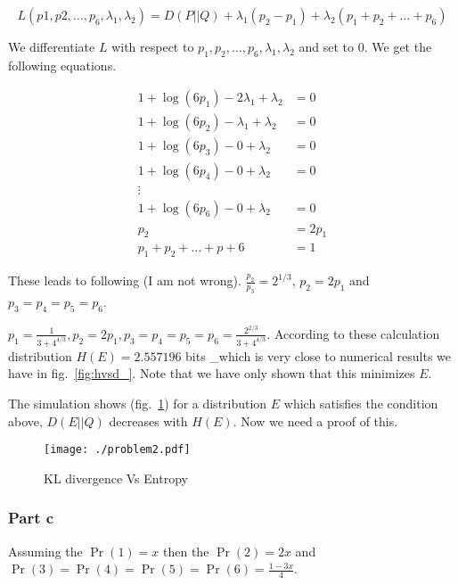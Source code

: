 \documentclass[]{article}
\begin{document}
\[L(p1,p2,\ldots,p_6,\lambda_1,\lambda_2) = D(P||Q) + \lambda_1(p_2-p_1) + 
\lambda_2(p_1+p_2+\ldots+p_6)\]

We differentiate \(L\) with respect to
\(p_1,p_2,\ldots,p_6,\lambda_1,\lambda_2\) and set to 0. We get the
following equations.

\[
\begin{aligned}
1 + \log( 6p_1 ) - 2 \lambda_1 + \lambda_2 &= 0 \\
1 + \log( 6p_2 ) - \lambda_1 + \lambda_2 &= 0 \\
1 + \log( 6p_3 ) - 0 + \lambda_2 &= 0 \\
1 + \log( 6p_4 ) - 0 + \lambda_2 &= 0 \\
\vdots \\
1 + \log( 6p_6 ) - 0 + \lambda_2 &= 0 \\
p_2 &= 2 p_1 \\
p_1 + p_2 + \dots + p+6 &= 1 
\end{aligned}
\]

These leads to following (I am not wrong).
\(\frac{p_2}{p_3} = 2^{1/3}\), \(p_2=2p_1\) and \(p_3=p_4=p_5=p_6\).

\(p_1=\frac{1}{3 + 4^{4/3}}, p_2=2p_1,p_3=p_4=p_5=p_6=\frac{2^{2/3}}{3+4^{4/3}}\).
According to these calculation distribution \(H(E)=2.557196\) bits
\_which is very close to numerical results we have in
fig.~\ref{fig:hvsd_}. Note that we have only shown that this minimizes
\(E\). 

The simulation shows (fig.~\ref{fig:hvsd}) for a distribution \(E\)
which satisfies the condition above, \(D(E||Q)\) decreases with
\(H(E)\). Now we need a proof of this.

\begin{figure}
\centering
\texttt{[image: ./problem2.pdf]}
\caption{KL divergence Vs Entropy}\label{fig:hvsd}
\end{figure}

\subsubsection{Part c}\label{part-c}

Assuming the \(\Pr(1)=x\) then the \(\Pr(2)=2x\) and
\(\Pr(3)=\Pr(4)=\Pr(5)=\Pr(6)=\frac{1-3x}{4}\).

\end{document}
